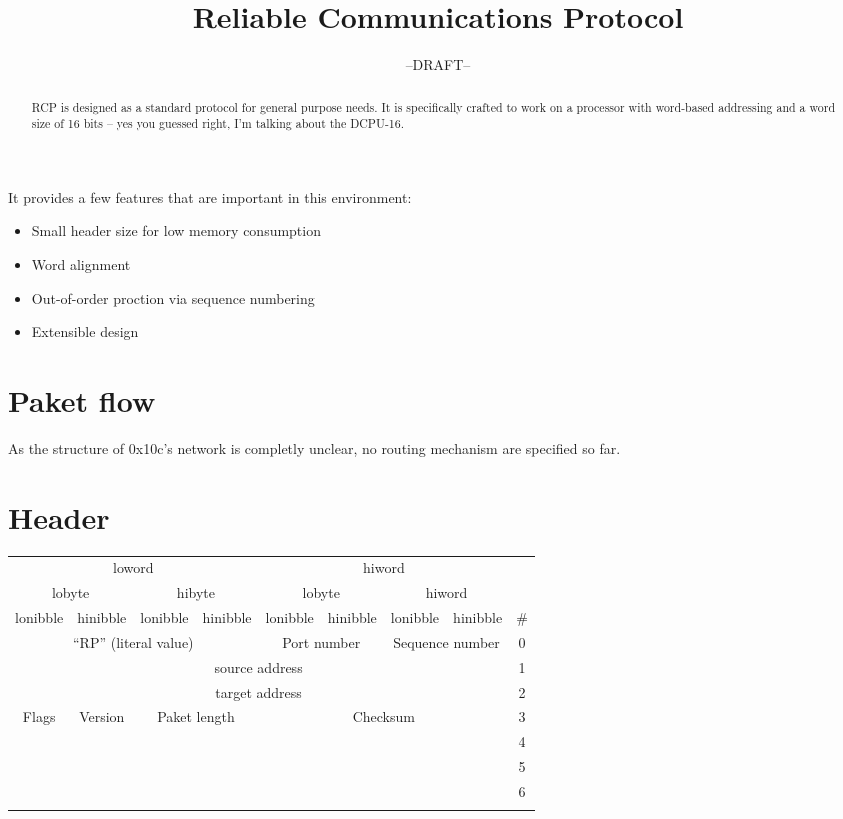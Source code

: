 \documentclass[12pt,a4paper,english,DIV=15,oneside,parskip=half]{scrartcl}
\begin{document}
\title{Reliable Communications Protocol}
\author{--DRAFT--}

\maketitle

\begin{abstract}

RCP is designed as a standard protocol for general purpose needs. It is specifically crafted to work on a processor with word-based addressing and a word size of 16 bits -- yes you guessed right, I\rq{}m talking about the DCPU-16.

\end{abstract}

It provides a few features that are important in this environment:
\begin{itemize}
\item Small header size for low memory consumption
\item Word alignment
\item Out-of-order proction via sequence numbering
\item Extensible design
\end{itemize}

\section{Paket flow}

As the structure of 0x10c\rq{}s network is completly unclear, no routing mechanism are specified so far.

\section{Header}

\begin{tabular}{|c|c|c|c|c|c|c|c|c|}
\cline{1-8} 
\multicolumn{4}{|c|}{loword} & \multicolumn{4}{c|}{hiword} & \multicolumn{1}{c}{}\tabularnewline
\cline{1-8} 
\multicolumn{2}{|c|}{lobyte} & \multicolumn{2}{c|}{hibyte} & \multicolumn{2}{c|}{lobyte} & \multicolumn{2}{c|}{hiword} & \multicolumn{1}{c}{}\tabularnewline
\hline 
lonibble & hinibble & lonibble & hinibble & lonibble & hinibble & lonibble & hinibble & \#\tabularnewline
\hline 
\multicolumn{4}{|c|}{``RP'' (literal value)} & \multicolumn{2}{c|}{Port number} & \multicolumn{2}{c|}{Sequence number} & 0\tabularnewline
\hline 
\multicolumn{8}{|c|}{source address} & 1\tabularnewline
\hline 
\multicolumn{8}{|c|}{target address} & 2\tabularnewline
\hline 
Flags & Version & \multicolumn{2}{c|}{Paket length} & \multicolumn{4}{c|}{Checksum} & 3\tabularnewline
\hline 
 &  &  &  &  &  &  &  & 4\tabularnewline
\hline 
 &  &  &  &  &  &  &  & 5\tabularnewline
\hline 
 &  &  &  &  &  &  &  & 6\tabularnewline
\hline 
 &  &  &  &  &  &  &  & \tabularnewline
\cline{1-1} \cline{9-9} 
\end{tabular}
\end{document}

